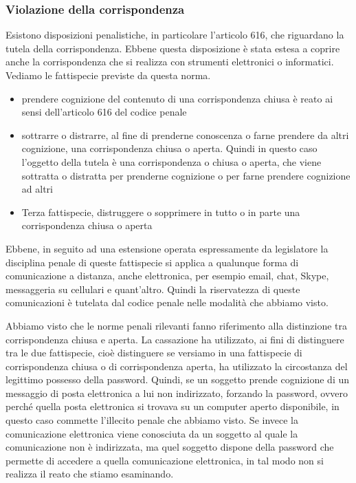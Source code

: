 \subsubsection{Violazione della corrispondenza}
Esistono disposizioni penalistiche, in particolare l'articolo 616, che riguardano la tutela della corrispondenza. Ebbene questa disposizione è stata estesa a coprire anche la corrispondenza che si realizza con strumenti elettronici o informatici. 
Vediamo le fattispecie previste da questa norma. 

\begin{itemize}
    \item prendere cognizione del contenuto di una corrispondenza chiusa è reato ai sensi dell'articolo 616 del codice penale
    \item sottrarre o distrarre, al fine di prenderne conoscenza o farne prendere da altri cognizione, una corrispondenza chiusa o aperta. Quindi in questo caso l'oggetto della tutela è una corrispondenza o chiusa o aperta, che viene sottratta o distratta per prenderne cognizione o per farne prendere cognizione ad altri
    \item Terza fattispecie, distruggere o sopprimere in tutto o in parte una corrispondenza chiusa o aperta
\end{itemize}

Ebbene, in seguito ad una estensione operata espressamente da legislatore la disciplina penale di queste fattispecie si applica a qualunque forma di comunicazione a distanza, anche elettronica, per esempio email, chat, Skype, messaggeria su cellulari e quant'altro. Quindi la riservatezza di queste comunicazioni è tutelata dal codice penale nelle modalità che abbiamo visto. 

Abbiamo visto che le norme penali rilevanti fanno riferimento alla distinzione tra corrispondenza chiusa e aperta. La cassazione ha utilizzato, ai fini di distinguere tra le due fattispecie, cioè distinguere se versiamo in una fattispecie di corrispondenza chiusa o di corrispondenza aperta, ha utilizzato la circostanza del legittimo possesso della password. Quindi, se un soggetto prende cognizione di un messaggio di posta elettronica a lui non indirizzato, forzando la password, ovvero perché quella posta elettronica si trovava su un computer aperto disponibile, in questo caso commette l'illecito penale che abbiamo visto. 
Se invece la comunicazione elettronica viene conosciuta da un soggetto al quale la comunicazione non è indirizzata, ma quel soggetto dispone della password che permette di accedere a quella comunicazione elettronica, in tal modo non si realizza il reato che stiamo esaminando. 

